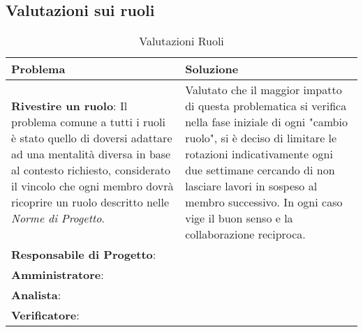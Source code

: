 \subsection{Valutazioni sui ruoli}
	\begin{longtable}{ 
			>{\centering}p{} 
			>{\centering\arraybackslash}p{} }
		
		\caption {Valutazioni Ruoli}		\\
		
		\textbf{\color{white}Problema} &
		\textbf{\color{white}Soluzione}
		\tabularnewline  
		\endhead
		
		\textbf{Rivestire un ruolo}: Il problema comune a tutti i ruoli è stato quello di doversi adattare ad una mentalità diversa in base al contesto richiesto, considerato il vincolo che ogni membro dovrà ricoprire un ruolo descritto nelle \textit{Norme di Progetto}. & Valutato che il maggior impatto di questa problematica si verifica nella fase iniziale di ogni "cambio ruolo", si è deciso di limitare le rotazioni indicativamente ogni due settimane cercando di non lasciare lavori in sospeso al membro successivo. In ogni caso vige il buon senso e la collaborazione reciproca. \\
		
		\textbf{Responsabile di Progetto}: & \\
		
		\textbf{Amministratore}: & \\
		
		\textbf{Analista}: & \\
		
		\textbf{Verificatore}: & \\
		
	\end{longtable}


